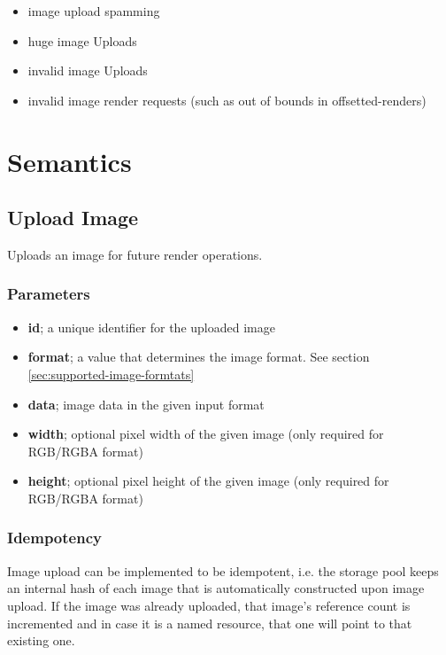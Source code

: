 \documentclass{article}
\begin{document}
\begin{itemize}
    \item image upload spamming
    \item huge image Uploads
    \item invalid image Uploads
    \item invalid image render requests (such as out of bounds in offsetted-renders)
\end{itemize}

\section{Semantics} %

\subsection{Upload Image}

Uploads an image for future render operations.

\subsubsection*{Parameters}

\begin{itemize}
    \item \textbf{id}; a unique identifier for the uploaded image
    \item \textbf{format}; a value that determines the image format. See section \ref{sec:supported-image-formtats}
    \item \textbf{data}; image data in the given input format
    \item \textbf{width}; optional pixel width of the given image (only required for RGB/RGBA format)
    \item \textbf{height}; optional pixel height of the given image (only required for RGB/RGBA format)
\end{itemize}

\subsubsection{Idempotency}

Image upload can be implemented to be idempotent, i.e. the storage pool keeps an internal hash
of each image that is automatically constructed upon image upload.
If the image was already uploaded, that image's reference count is incremented
and in case it is a named resource, that one will point to that existing one.
\end{document}
